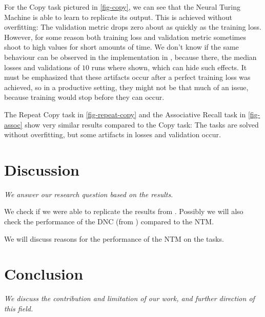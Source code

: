 \documentclass[12pt,twoside]{article}
\theoremstyle{plain}
\theoremstyle{definition}
\theoremstyle{remark}
\begin{document}
For the Copy task pictured in \autoref{fig-copy}, we can see that the Neural Turing Machine is able to learn to replicate its output. This is achieved without overfitting: The validation metric drops zero about as quickly as the training loss. However, for some reason both training loss and validation metric sometimes shoot to high values for short amounts of time. We don't know if the same behaviour can be observed in the implementation in \cite{implementing-ntm}, because there, the median losses and validations of $10$ runs where shown, which can hide such effects. It must be emphasized that these artifacts occur after a perfect training loss was achieved, so in a productive setting, they might not be that much of an issue, because training would stop before they can occur.

The Repeat Copy task in \autoref{fig-repeat-copy} and the Associative Recall task in \autoref{fig-assoc} show very similar results compared to the Copy task: The tasks are solved without overfitting, but some artifacts in losses and validation occur. 

\section{Discussion}
\textit{We answer our research question based on the results.}

We check if we were able to replicate the results from \cite{implementing-ntm}. Possibly we will also check the performance of the DNC (from \cite{original-dnc}) compared to the NTM.

We will discuss reasons for the performance of the NTM on the tasks.

\section{Conclusion}
\textit{We discuss the contribution and limitation of our work, and further direction of this field.}

%
\newpage


\end{document}
